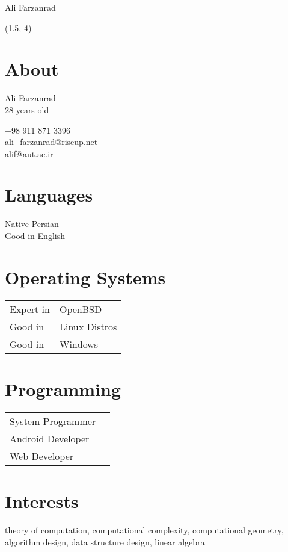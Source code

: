 \documentclass[a4paper,10pt]{article}
\begin{document}
{\Huge Ali Farzanrad}

\begin{textblock}{3.8}(1.5, 4)
	\raggedleft
	\section*{About}

	Ali Farzanrad \\
	28 years old

	+98 911 871 3396 \\
	\href{mailto:ali_farzanrad@riseup.net}{ali\_farzanrad@riseup.net} \\
	\href{mailto:alif@aut.ac.ir}{alif@aut.ac.ir}

	\section*{Languages}

	Native Persian \\
	Good in English

	\section*{Operating Systems}

	\begin{tabular}{ll}
		Expert in & OpenBSD \\
		Good in & Linux Distros \\
		Good in & Windows
	\end{tabular}

	\section*{Programming}

	\begin{tabular}{ll}
		System Programmer \\
		Android Developer \\
		Web Developer
	\end{tabular}

\end{textblock}

\section*{{\color{blue}I}nterests}

theory of computation, computational complexity, computational
geometry, algorithm design, data structure design, linear algebra
\end{document}
